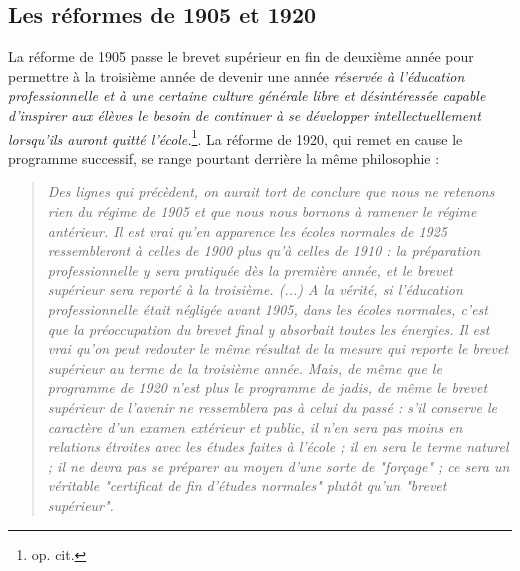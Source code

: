 \documentclass[a4paper,11pt]{article}
\begin{document}
			\subsection{Les réformes de 1905 et 1920}
			La réforme de 1905 passe le brevet supérieur en fin de deuxième année pour permettre à la troisième année de devenir une année \emph{réservée à l'éducation professionnelle et à une certaine culture générale libre et désintéressée capable d'inspirer aux élèves le besoin de continuer à se développer intellectuellement lorsqu'ils auront quitté l'école.}\footnote{op. cit.}. La réforme de 1920, qui remet en cause le programme successif, se range pourtant derrière la même philosophie : 
			\begin{quote}
			\emph{Des lignes qui précèdent, on aurait tort de conclure que nous ne retenons rien du régime de 1905 et que nous nous bornons à ramener le régime antérieur. Il est vrai qu'en apparence les écoles normales de 1925 ressembleront à celles de 1900 plus qu'à celles de 1910 : la préparation professionnelle y sera pratiquée dès la première année, et le brevet supérieur sera reporté à la troisième. (...) A la vérité, si l'éducation professionnelle était négligée avant 1905, dans les écoles normales, c'est que la préoccupation du brevet final y absorbait toutes les énergies. Il est vrai qu'on peut redouter le même résultat de la mesure qui reporte le brevet supérieur au terme de la troisième année. Mais, de même que le programme de 1920 n'est plus le programme de jadis, de même le brevet supérieur de l'avenir ne ressemblera pas à celui du passé : s'il conserve le caractère d'un examen extérieur et public, il n'en sera pas moins en relations étroites avec les études faites à l'école ; il en sera le terme naturel ; il ne devra pas se préparer au moyen d'une sorte de "forçage" ; ce sera un véritable "certificat de fin d'études normales" plutôt qu'un "brevet supérieur".} 
			\end{quote}
				    
			
\end{document}
